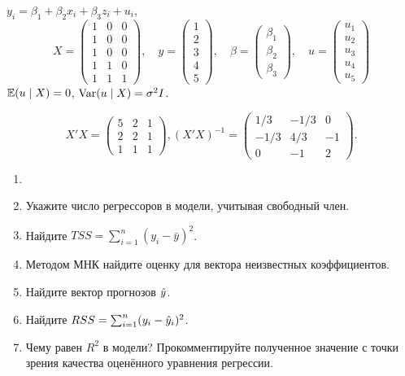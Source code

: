 \begin{problem}
  $y_i = \beta_1 + \beta_2 x_{i} + \beta_3 z_i + u_i$, 
\[
X = \begin{pmatrix} 
  1 & 0 & 0 \\ 
  1 & 0 & 0 \\ 
  1 & 0 & 0 \\ 
  1 & 1 & 0 \\ 
  1 & 1 & 1 
\end{pmatrix}, \quad
y = \begin{pmatrix} 1 \\ 2 \\ 3 \\ 4 \\ 5 \end{pmatrix}, \quad
\beta = \begin{pmatrix} \beta_1 \\ \beta_2 \\ \beta_3 \end{pmatrix}, \quad
u = \begin{pmatrix} u_1 \\ u_2 \\ u_3 \\ u_4 \\ u_5  \end{pmatrix}
\]
$\operatorname{\mathbb E}(u \mid X) = 0$, $\operatorname{Var}(u \mid X) = \sigma^2 I$. 


\[
X'X = \begin{pmatrix} 
  5 & 2 & 1 \\ 
  2 & 2 & 1\\ 
  1 & 1 & 1 
\end{pmatrix},
(X'X)^{-1}= \begin{pmatrix} 
  1/3 & -1/3 & 0 \\ 
  -1/3 & 4/3 & -1 \\ 
  0 & -1 & 2 \end{pmatrix}.
\]


\begin{enumerate}
\item {}
\item Укажите число регрессоров в модели, учитывая свободный член.
\item Найдите $TSS = \sum_{i=1}^n (y_i - \bar y)^2$.
\item Методом МНК найдите оценку для вектора неизвестных коэффициентов.
\item Найдите вектор прогнозов $\hat{y}$.
\item Найдите $RSS = \sum_{i=1}^n (y_i - \hat{y}_i)^2$.
\item Чему равен $R^2$ в модели? Прокомментируйте полученное значение с точки зрения качества оценённого уравнения регрессии.\end{enumerate}
\begin{sol}


\end{sol}
\end{problem}
